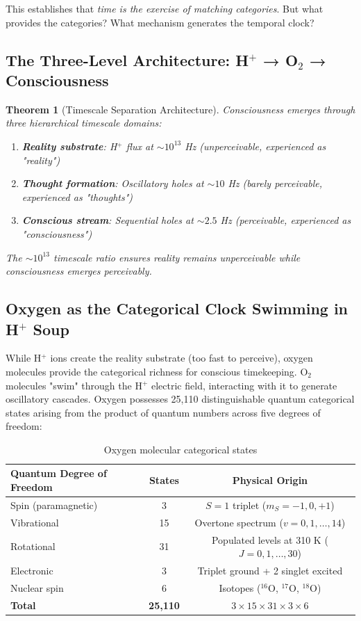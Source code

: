 \documentclass[11pt,a4paper]{article}
\newtheorem{theorem}{Theorem}
\begin{document}
This establishes that \textit{time is the exercise of matching categories}. But what provides the categories? What mechanism generates the temporal clock?

\subsection{The Three-Level Architecture: H$^+$ → O$_2$ → Consciousness}

\begin{theorem}[Timescale Separation Architecture]
Consciousness emerges through three hierarchical timescale domains:
\begin{enumerate}
\item \textbf{Reality substrate}: H$^+$ flux at $\sim 10^{13}$ Hz (unperceivable, experienced as "reality")
\item \textbf{Thought formation}: Oscillatory holes at $\sim 10$ Hz (barely perceivable, experienced as "thoughts")  
\item \textbf{Conscious stream}: Sequential holes at $\sim 2.5$ Hz (perceivable, experienced as "consciousness")
\end{enumerate}

The $\sim 10^{13}$ timescale ratio ensures reality remains unperceivable while consciousness emerges perceivably.
\end{theorem}

\subsection{Oxygen as the Categorical Clock Swimming in H$^+$ Soup}

While H$^+$ ions create the reality substrate (too fast to perceive), oxygen molecules provide the categorical richness for conscious timekeeping. O$_2$ molecules "swim" through the H$^+$ electric field, interacting with it to generate oscillatory cascades. Oxygen possesses 25,110 distinguishable quantum categorical states arising from the product of quantum numbers across five degrees of freedom:

\begin{table}[H]
\centering
\caption{Oxygen molecular categorical states}
\label{tab:o2_states}
\begin{tabular}{lcc}
\toprule
\textbf{Quantum Degree of Freedom} & \textbf{States} & \textbf{Physical Origin} \\
\midrule
Spin (paramagnetic) & 3 & $S=1$ triplet ($m_S = -1, 0, +1$) \\
Vibrational & 15 & Overtone spectrum ($v = 0, 1, \ldots, 14$) \\
Rotational & 31 & Populated levels at 310 K ($J = 0, 1, \ldots, 30$) \\
Electronic & 3 & Triplet ground + 2 singlet excited \\
Nuclear spin & 6 & Isotopes ($^{16}$O, $^{17}$O, $^{18}$O) \\
\midrule
\textbf{Total} & \textbf{25,110} & $3 \times 15 \times 31 \times 3 \times 6$ \\
\bottomrule
\end{tabular}
\end{table}
\end{document}

